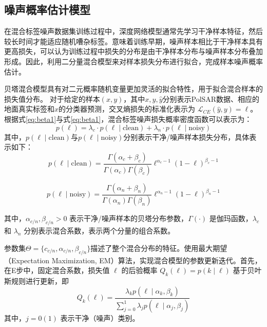 \subsection{噪声概率估计模型}
在混合标签噪声数据集训练过程中，深度网络模型通常先学习干净样本特征，然后较长时间才能适应随机嘈杂标签。意味着训练早期，噪声样本相比于干净样本具有更高损失，可以认为训练过程中损失的分布是由干净样本分布与噪声样本分布叠加形成。因此，利用二分量混合模型来对样本损失分布进行拟合，完成样本噪声概率估计。

贝塔混合模型具有对二元概率随机变量更加灵活的拟合特性，用于拟合混合样本的损失值分布。
对于给定的样本$(x, y)$，其中$x, y, \hat{y}$分别表示PolSAR数据、相应的地面真实标签和$x$的分类器预测，交叉熵损失的标准化表示为 $\mathcal{L}_{CE}(\hat{y}, y) = \ell$。根据式\ref{eq:beta1}与式\ref{eq:beta1}，混合标签噪声损失概率密度函数可以表示为：
\begin{equation}
  p(\ell)=\lambda_c \cdot p(\ell \mid \text{clean})+\lambda_n \cdot p(\ell \mid \text{noisy})
\end{equation}
其中，$p(\ell \mid \text{clean})$与$p(\ell \mid \text{noisy})$分别表示干净/噪声样本损失分布，具体表示如下：
\begin{equation}
  p(\ell \mid \text{clean})=\frac{\Gamma(\alpha_c+\beta_c)}{\Gamma(\alpha_c) \Gamma(\beta_c)} \ell^{\alpha_c-1}(1-\ell)^{\beta_c-1}
\end{equation}

\begin{equation}
  p(\ell \mid \text{noisy})=\frac{\Gamma(\alpha_n+\beta_n)}{\Gamma(\alpha_n) \Gamma(\beta_n)} \ell^{\alpha_n-1}(1-\ell)^{\beta_n-1}
  \label{eq:BMM_PDF}
\end{equation}

其中，$\alpha_{c/n}, \beta_{c/n} > 0$ 表示干净/噪声样本的贝塔分布参数，$\Gamma(\cdot)$ 是伽玛函数，$\lambda_{c}$ 和 $\lambda_{n}$ 分别表示混合系数，表示两个分量的组合系数。

参数集$\Theta = \{c_{c/n}, \alpha_{c/n}, \beta_{c/n}\}$描述了整个混合分布的特征。使用最大期望（Expectation Maximization, EM）算法，实现混合模型的参数更新迭代。首先，在E步中，固定混合系数，损失值 \(\ell\) 的后验概率 \(Q_k(\ell)=p(k \mid \ell)\) 基于贝叶斯规则进行更新，即
\begin{equation}
  Q_k(\ell)=\frac{\lambda_k p(\ell \mid \alpha_k, \beta_k)}{\sum_{j=0}^{1}\lambda_j p(\ell \mid \alpha_j, \beta_j)}
\end{equation}
其中，$j=0(1)$ 表示干净（噪声）类别。

